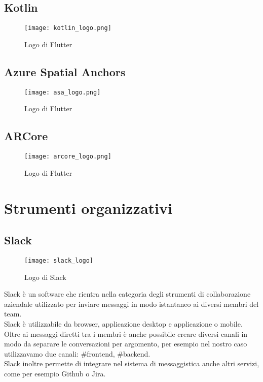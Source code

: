\subsection{Kotlin}
\begin{figure}[ht]
    \centering
    \texttt{[image: kotlin\_logo.png]}
    \caption{Logo di Flutter}
\end{figure} \aCapo{}

\subsection{Azure Spatial Anchors}
\begin{figure}[ht]
    \centering
    \texttt{[image: asa\_logo.png]}
    \caption{Logo di Flutter}
\end{figure} \aCapo{}

\subsection{ARCore}
\begin{figure}[ht]
    \centering
    \texttt{[image: arcore\_logo.png]}
    \caption{Logo di Flutter}
\end{figure} \aCapo{}
\section{Strumenti organizzativi}

\subsection{Slack}
\begin{figure}[ht]
    \centering
    \texttt{[image: slack\_logo]}
    \caption{Logo di Slack}
\end{figure}

Slack è un software che rientra nella categoria degli strumenti di collaborazione aziendale utilizzato per inviare messaggi in modo istantaneo ai diversi membri del team.\\
Slack è utilizzabile da browser, applicazione desktop e applicazione o mobile.\\
Oltre ai messaggi diretti tra i membri è anche possibile creare diversi canali in modo da separare le conversazioni per argomento, per esempio nel nostro caso utilizzavamo due canali: \#frontend, \#backend.\\
Slack inoltre permette di integrare nel sistema di messaggistica anche altri servizi, come per esempio Github o Jira.

